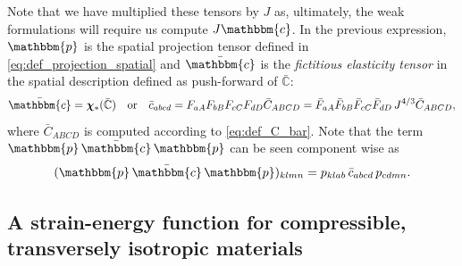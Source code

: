 \documentclass{sfuthesis}
\numberwithin{equation}{section}
\numberwithin{figure}{chapter}
\numberwithin{table}{chapter}
\theoremstyle{definition}
\newcommand{\C}{\mathbb{C}}
\renewcommand{\c}{\mathbbm{c}}
\newcommand{\p}{\mathbbm{p}}
\def\bchi{{\bm{\chi}}}
\begin{document}
Note that we have multiplied these tensors by $J$ as, ultimately, the weak formulations will require us compute $J\c$. In the previous expression, $\p$ is the spatial projection tensor defined in \eqref{eq:def_projection_spatial} and $\bar{\c}$ is the \textit{fictitious elasticity tensor} in the spatial description defined as push-forward of $\bar{\C}$:
\begin{equation} \label{eq:def_c_bar}
\bar{\c} = \bchi_*(\bar{\C}) \quad \text{or} \quad \bar{c}_{abcd} = F_{aA} F_{bB} F_{cC} F_{dD} \bar{C}_{ABCD} = \bar{F}_{aA} \bar{F}_{bB} \bar{F}_{cC} \bar{F}_{dD} \, J^{4/3} \bar{C}_{ABCD},
\end{equation}
where $\bar{C}_{ABCD}$ is computed according to \eqref{eq:def_C_bar}. Note that the term $\p \, \bar{\c} \, \p$ can be seen component wise as 
\begin{equation}
    (\p \, \bar{\c} \, \p)_{klmn} = p_{klab} \, \bar{c}_{abcd} \, p_{cdmn}.
\end{equation}

\subsection{A strain-energy function for compressible, transversely isotropic materials}
\end{document}
